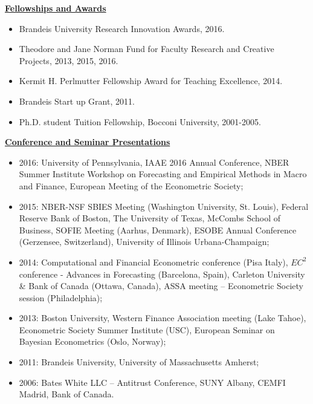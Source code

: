 \documentclass[12pt]{article}
\begin{document}
\underline{\textbf{Fellowships and Awards}}\\
\begin{itemize}
\item Brandeis University Research Innovation Awards, 2016. 
\item Theodore and Jane Norman Fund for Faculty Research and Creative Projects, 2013, 2015, 2016. 
\item Kermit H. Perlmutter Fellowship Award for Teaching Excellence, 2014. 
\item Brandeis Start up Grant, 2011. 
\item Ph.D. student Tuition Fellowship, Bocconi University, 2001-2005.
\end{itemize}
\underline{\textbf{Conference and Seminar Presentations}}
\begin{itemize}
	\item 2016: University of Pennsylvania, IAAE 2016 Annual Conference, NBER Summer Institute Workshop on Forecasting and Empirical Methods in Macro and Finance, European Meeting of the Econometric Society;
  \item 2015: NBER-NSF SBIES Meeting (Washington University, St. Louis), Federal Reserve Bank of Boston, The University of Texas, McCombs School of Business, SOFIE Meeting (Aarhus, Denmark), ESOBE Annual Conference (Gerzensee, Switzerland), University of Illinois Urbana-Champaign;
	\item 2014: Computational and Financial Econometric conference (Pisa Italy), $EC^2$ conference - Advances in Forecasting (Barcelona, Spain),  Carleton University & Bank of Canada (Ottawa, Canada), ASSA meeting -- Econometric Society session (Philadelphia);  
	\item 2013: Boston University, Western Finance Association meeting (Lake Tahoe), Econometric Society Summer Institute (USC), European Seminar on Bayesian Econometrics (Oslo, Norway); 
	\item 2011: Brandeis University, University of Massachusetts Amherst; 
	\item 2006: Bates White LLC -- Antitrust Conference, SUNY Albany, CEMFI Madrid, Bank of Canada.
\end{itemize}
\end{document}
